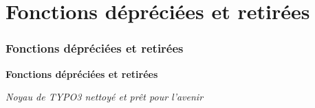 %

\section{Fonctions dépréciées et retirées}
\begin{frame}[fragile]
	\frametitle{Fonctions dépréciées et retirées}

	\begin{center}\huge{\color{typo3darkgrey}\textbf{Fonctions dépréciées et retirées}}\end{center}
	\begin{center}\large{\textit{Noyau de TYPO3 nettoyé et prêt pour l'avenir}}\end{center}

\end{frame}


